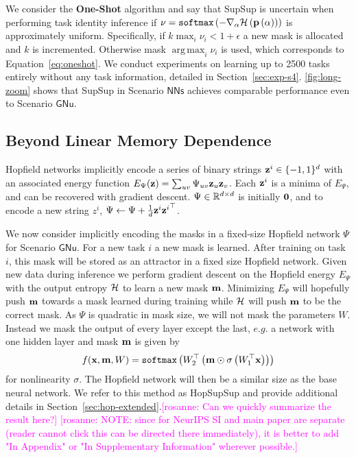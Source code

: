 \documentclass{article}
\DeclareMathOperator*{\argmax}{arg\,max}
\newcommand{\ac}{SupSup\xspace}
\newcommand{\comments}[1]{#1}
\newcommand{\comments}[1]{}
\newcommand{\rosanne}[1]{\comments{\textcolor{magenta}{[rosanne: #1]}}}
\newcommand{\casename}[1]{\ensuremath{\mathsf{#1}}\xspace}
\newcommand{\secref}[1]{Section~\ref{sec:#1}}
\begin{document}
We consider the \textbf{One-Shot} algorithm and say that \ac is uncertain when performing task identity inference if $\nu = \texttt{softmax}\left( -\nabla_\alpha \mathcal{H} \left( \mathbf{p}\left( \alpha \right) \right) \right)$ is approximately uniform. Specifically, if $k \max_i \nu_i < 1 + \epsilon $ a new mask is allocated and $k$ is incremented. Otherwise mask $\argmax_i \nu_i$ is used, which corresponds to Equation~\ref{eq:oneshot}. We conduct experiments on learning up to 2500 tasks entirely without any task information, detailed in \secref{exp-s4}. \autoref{fig:long-zoom} shows that \ac in Scenario \casename{NNs} achieves comparable performance even to Scenario \casename{GNu}.



\subsection{Beyond Linear Memory Dependence} \label{sec:hop} \label{sec:beyond-linear-mem}
Hopfield networks \cite{hopfield1982neural} implicitly encode a series of binary strings $\mathbf{z}^i \in \{-1,1\}^d$ with an associated energy function $E_\Psi(\mathbf{z}) = \sum_{uv} \Psi_{uv}\mathbf{z}_u\mathbf{z}_v$. Each $\mathbf{z}^i$ is a minima of $E_\Psi$, and can be recovered with gradient descent. $\Psi \in \mathbb{R}^{d \times d}$ is initially $\mathbf{0}$, and to encode a new string $z^i$, $\Psi \gets \Psi + \frac{1}{d}\mathbf{z}^i {\mathbf{z}^i}^\top $.

We now consider implicitly encoding the masks in a fixed-size Hopfield network $\Psi$ for Scenario \casename{GNu}. For a new task $i$ a new mask is learned. After training on task $i$, this mask will be stored as an attractor in a fixed size Hopfield network. Given new data during inference we perform gradient descent on the Hopfield energy $E_\Psi$ with the output entropy $\mathcal{H}$ to learn a new mask $\mathbf{m}$. Minimizing $E_\Psi$ will hopefully push $\mathbf{m}$ towards a mask learned during training while $\mathcal{H}$ will push $\mathbf{m}$ to be the correct mask. 
As $\Psi$ is quadratic in mask size, we will not mask the parameters $W$. Instead we mask the output of every layer except the last, $\textit{e.g.}$ a network with one hidden layer and mask $\mathbf{m}$ is given by
\begin{align}
    f(\mathbf{x}, \mathbf{m}, W) = \texttt{softmax}\left( W_2^\top \left( \mathbf{m} \odot \sigma\left( W_1^\top \mathbf{x}  \right) \right)  \right)
\end{align}
for nonlinearity $\sigma$. The Hopfield network will then be a similar size as the base neural network. We refer to this method as Hop\ac and provide additional details in Section~\ref{sec:hop-extended}.\rosanne{Can we quickly summarize the result here?}
\rosanne{NOTE: since for NeurIPS SI and main paper are separate (reader cannot click this can be directed there immediately), it is better to add "In Appendix" or "In Supplementary Information" wherever possible.}
\end{document}
